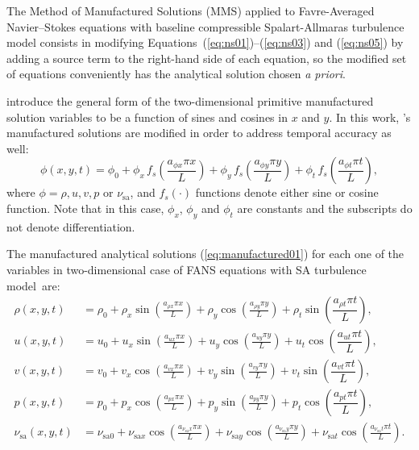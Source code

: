 \documentclass[10pt]{article}
\newcommand{\sa}{\nu_{\mathrm{sa}}}
\newcommand{\tsa}{\mathrm{sa}}
\begin{document}
The Method of Manufactured Solutions (MMS) applied to Favre-Averaged Navier--Stokes equations with baseline compressible Spalart-Allmaras turbulence model consists in modifying Equations~(\ref{eq:ns01})--(\ref{eq:ns03}) and (\ref{eq:ns05})  by adding a source term to the right-hand side of each equation, so the modified set of equations conveniently has the analytical solution chosen \textit{a priori}.

\citet{Roy2002} introduce the general form of the two-dimensional primitive manufactured solution variables to be  a function of sines and cosines in $x$ and $y$. In this work, \citet{Roy2002}'s manufactured solutions are modified in order to address temporal accuracy as well:
\begin{equation}
 \label{eq:manufactured01}
  \phi (x,y,t) = \phi_0+ \phi_x\, f_s \left(\frac{a_{\phi x} \pi x}{L} \right) +  \phi_y \,f_s\left(\frac{a_{\phi y} \pi y}{L}\right) + \phi_t \,f_s\left(\frac{a_{\phi t} \pi t}{L}\right),
\end{equation}
where $\phi=\rho,u,v,p$ or $\sa$, and $f_s(\cdot)$ functions denote either sine or cosine function. Note that in this case, $\phi_x$, $\phi_y$  and $\phi_t$ are constants  and the subscripts do not denote differentiation.

The manufactured analytical solutions (\ref{eq:manufactured01}) for each one of the variables in two-dimensional case of FANS equations with SA turbulence model~are:
 \begin{equation}
 \begin{split}
\label{eq:manufactured_2d}
\rho\left(x,y,t\right) &=  \rho_{0}+ \rho_{x} \sin\left(\frac{a_{ \rho x} \pi x}{L}\right)+ \rho_{y} \cos\left(\frac{a_{ \rho y} \pi y}{L}\right)+ \rho_t \sin\left(\dfrac{a_{\rho t} \pi t}{L}\right),\\
u\left(x,y,t\right) &= u_{0}+u_{x} \sin\left(\frac{a_{u x} \pi x}{L}\right)+u_{y} \cos\left(\frac{a_{u y} \pi y}{L}\right) + u_t \cos\left(\dfrac{a_{u t} \pi t}{L}\right),\\
v\left(x,y,t\right) &= v_{0}+v_{x} \cos\left(\frac{a_{v x} \pi x}{L}\right)+v_{y} \sin\left(\frac{a_{v y} \pi y}{L}\right)+ v_t \sin\left(\dfrac{a_{v t} \pi t}{L}\right),\\
p\left(x,y,t\right) &= p_{0}+p_{x} \cos\left(\frac{a_{p x} \pi x}{L}\right)+p_{y} \sin\left(\frac{a_{p y} \pi y}{L}\right)+ p_t \cos\left(\dfrac{a_{p t} \pi t}{L}\right),\\
\sa(x,y,t) &= \nu_{\tsa 0} +\nu_{\tsa x} \cos\left(\frac{a_{\sa x} \pi x}{L}\right) + \nu_{\tsa y} \cos\left(\frac{a_{\sa y} \pi y}{L}\right) + \nu_{\tsa t}\cos\left(\frac{a_{\sa t} \pi t}{L}\right).
\end{split}
\end{equation}
\end{document}
